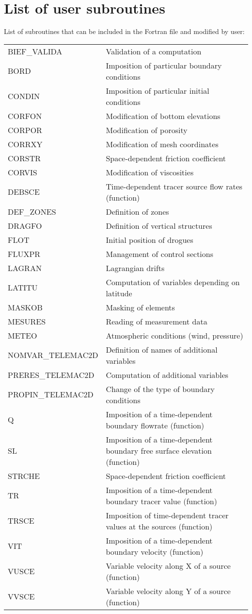 \chapter{List of user subroutines}
\label{tel2d:app2}
List of subroutines that can be included in the Fortran file and modified by user:\\
\begin{tabular}{p{}p{4.0in}}
BIEF\_VALIDA &Validation of a computation\\
BORD &Imposition of particular boundary conditions\\
CONDIN &Imposition of particular initial conditions\\
CORFON &Modification of bottom elevations\\
CORPOR &Modification of porosity\\
CORRXY &Modification of mesh coordinates\\
CORSTR &Space-dependent friction coefficient\\
CORVIS &Modification of viscosities\\
DEBSCE &Time-dependent tracer source flow rates (function)\\
DEF\_ZONES &Definition of zones\\
DRAGFO &Definition of vertical structures\\
FLOT &Initial position of drogues\\
FLUXPR &Management of control sections\\
LAGRAN &Lagrangian drifts\\
LATITU &Computation of variables depending on latitude\\
MASKOB &Masking of elements\\
MESURES& Reading of measurement data\\
METEO &Atmospheric conditions (wind, pressure)\\
NOMVAR\_TELEMAC2D &Definition of names of additional variables\\
PRERES\_TELEMAC2D &Computation of additional variables\\
PROPIN\_TELEMAC2D &Change of the type of boundary conditions\\
Q &Imposition of a time-dependent boundary flowrate (function)\\
SL &Imposition of a time-dependent boundary free surface elevation (function)\\
STRCHE &Space-dependent friction coefficient\\
TR &Imposition of a time-dependent boundary tracer value (function)\\
TRSCE &Imposition of time-dependent tracer values at the sources (function)\\
VIT &Imposition of a time-dependent boundary velocity (function)\\
VUSCE &Variable velocity along X of a source (function)\\
VVSCE &Variable velocity along Y of a source (function)\\
\end{tabular}
 

